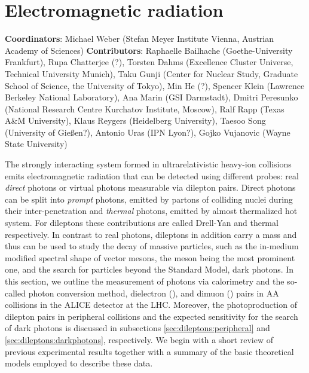 \documentclass[../report.tex]{subfiles}
\begin{document}
\section{Electromagnetic radiation}

\textbf{Coordinators}: Michael Weber (Stefan Meyer Institute Vienna, Austrian Academy of Sciences) 
\linebreak
\textbf{Contributors}: 
		Raphaelle Bailhache (Goethe-University Frankfurt), 
        Rupa Chatterjee (?),
		Torsten Dahms (Excellence Cluster Universe, Technical University Munich), 
		Taku Gunji (Center for Nuclear Study, Graduate School of Science, the University of Tokyo), 
        Min He (?),
        Spencer Klein (Lawrence Berkeley National Laboratory), 
        Ana Marin (GSI Darmstadt), 
        Dmitri Peresunko (National Research Centre Kurchatov Institute, Moscow),  
        Ralf Rapp (Texas A\&M University), 
        Klaus Reygers (Heidelberg University), 
        Taesoo Song (University of Gie{\ss}en?), 
        Antonio Uras (IPN Lyon?),
        Gojko Vujanovic (Wayne State University)



The strongly interacting system formed in ultrarelativistic heavy-ion collisions 
emits electromagnetic radiation that can be detected using different probes: real {\it direct} photons %
or virtual photons measurable via dilepton pairs. 
Direct photons can be split into {\it prompt} photons, emitted by partons of colliding nuclei during their inter-penetration and {\it thermal} photons, emitted by almost thermalized hot system. 
For dileptons these contributions are called Drell-Yan and thermal respectively.
In contrast to real photons, dileptons in addition carry a mass and thus can be used to study the decay of massive particles, such as the in-medium modified spectral shape of vector mesons, the \PGr meson being the most prominent one, and the search for particles beyond the Standard Model, \eg dark photons. In this section, we outline the measurement of photons via calorimetry and the so-called photon conversion method, dielectron (\Pepem), and dimuon (\PGmpGmm) pairs in AA collisions in the ALICE detector at the LHC. Moreover, the photoproduction of dilepton pairs in peripheral collisions and the expected sensitivity for the search of dark photons is discussed in subsections \ref{sec:dileptons:peripheral} and \ref{sec:dileptons:darkphotons}, respectively. We begin with a short review of previous experimental results together with a summary of the basic theoretical models employed to describe these data.
\end{document}
